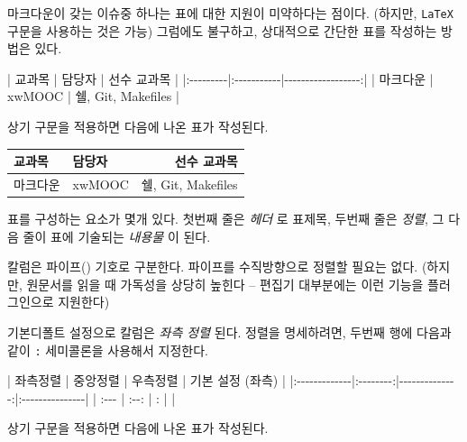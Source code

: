 \documentclass[
  letterpaper,
]{book}
\newenvironment{Shaded}{\begin{snugshade}}{\end{snugshade}}
\newcommand{\AttributeTok}[1]{\textcolor[rgb]{0.40,0.45,0.13}{#1}}
\begin{document}
마크다운이 갖는 이슈중 하나는 표에 대한 지원이 미약하다는 점이다.
(하지만, \texttt{LaTeX} 구문을 사용하는 것은 가능) 그럼에도 불구하고,
상대적으로 간단한 표를 작성하는 방법은 있다.

\begin{Shaded}
\begin{Highlighting}[]
\AttributeTok{|  교과목  |    담당자 |     선수 교과목 |}
\AttributeTok{|:{-}{-}{-}{-}{-}{-}{-}{-}{-}|:{-}{-}{-}{-}{-}{-}{-}{-}{-}{-}{-}|{-}{-}{-}{-}{-}{-}{-}{-}{-}{-}{-}{-}{-}{-}{-}{-}{-}{-}:|}
\AttributeTok{| 마크다운 | xwMOOC        | 쉘, Git, Makefiles |}
\end{Highlighting}
\end{Shaded}

상기 구문을 적용하면 다음에 나온 표가 작성된다.

\begin{longtable}[]{@{}llr@{}}
\toprule\noalign{}
교과목 & 담당자 & 선수 교과목 \\
\midrule\noalign{}
\endhead
\bottomrule\noalign{}
\endlastfoot
마크다운 & xwMOOC & 쉘, Git, Makefiles \\
\end{longtable}

표를 구성하는 요소가 몇개 있다. 첫번째 줄은 \emph{헤더} 로 표제목,
두번째 줄은 \emph{정렬}, 그 다음 줄이 표에 기술되는 \emph{내용물} 이
된다.

칼럼은 파이프(\texttt{\textbar{}}) 기호로 구분한다. 파이프를
수직방향으로 정렬할 필요는 없다. (하지만, 원문서를 읽을 때 가독성을
상당히 높힌다 -- 편집기 대부분에는 이런 기능을 플러그인으로 지원한다)

기본디폴트 설정으로 칼럼은 \emph{좌측 정렬} 된다. 정렬을 명세하려면,
두번째 행에 다음과 같이 \texttt{:} 세미콜론을 사용해서 지정한다.

\begin{Shaded}
\begin{Highlighting}[]
\AttributeTok{|   좌측정렬  |  중앙정렬  |    우측정렬   | 기본 설정 (좌측) |}
\AttributeTok{|:{-}{-}{-}{-}{-}{-}{-}{-}{-}{-}{-}{-}{-}|:{-}{-}{-}{-}{-}{-}{-}{-}:|{-}{-}{-}{-}{-}{-}{-}{-}{-}{-}{-}{-}{-}{-}:|:{-}{-}{-}{-}{-}{-}{-}{-}{-}{-}{-}{-}{-}{-}{-}|}
\AttributeTok{| \textasciigrave{}:{-}{-}{-}\textasciigrave{}       |  \textasciigrave{}:{-}{-}:\textasciigrave{}  |        \textasciigrave{}{-}{-}{-}:\textasciigrave{} | \textasciigrave{}{-}{-}{-}{-}\textasciigrave{}         |}
\end{Highlighting}
\end{Shaded}

상기 구문을 적용하면 다음에 나온 표가 작성된다.
\end{document}
